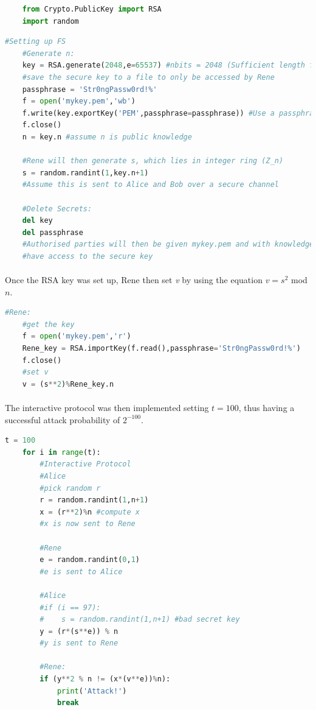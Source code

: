 \documentclass[12pt, twoside]{report}
\begin{document}
	\begin{lstlisting}[language=Python]
	%reset
	from Crypto.PublicKey import RSA
	import random
	\end{lstlisting}
	\begin{lstlisting}[language=Python]
	#Setting up FS
	#Generate n:
	key = RSA.generate(2048,e=65537) #nbits = 2048 (Sufficient length for 2017), e -> FIPS Standard
	#save the secure key to a file to only be accessed by Rene
	passphrase = 'Str0ngPassw0rd!%'
	f = open('mykey.pem','wb')
	f.write(key.exportKey('PEM',passphrase=passphrase)) #Use a passphrase since 
	f.close()
	n = key.n #assume n is public knowledge
	
	#Rene will then generate s, which lies in integer ring (Z_n)
	s = random.randint(1,key.n+1)
	#Assume this is sent to Alice and Bob over a secure channel
	
	#Delete Secrets:
	del key
	del passphrase 
	#Authorised parties will then be given mykey.pem and with knowledge of the passphrase will
	#have access to the secure key
	\end{lstlisting}
	
	\paragraph{ } Once the RSA key was set up, Rene then set \textit{v} by using the equation $v=s^2$ mod $n$.
	
	\begin{lstlisting}[language=Python]
	#Rene:
	#get the key
	f = open('mykey.pem','r')
	Rene_key = RSA.importKey(f.read(),passphrase='Str0ngPassw0rd!%')
	f.close()
	#set v
	v = (s**2)%Rene_key.n
	\end{lstlisting}
	
	\paragraph{ }The interactive protocol was then implemented setting $t=100$, thus having a successful attack probability of $2^{-100}$.
	
	\begin{lstlisting}[language=Python]
	t = 100
	for i in range(t):
		#Interactive Protocol
		#Alice
		#pick random r
		r = random.randint(1,n+1)
		x = (r**2)%n #compute x
		#x is now sent to Rene
		
		#Rene
		e = random.randint(0,1)
		#e is sent to Alice
		
		#Alice
		#if (i == 97):
		#    s = random.randint(1,n+1) #bad secret key
		y = (r*(s**e)) % n
		#y is sent to Rene
		
		#Rene:
		if (y**2 % n != (x*(v**e))%n):
			print('Attack!')
			break
	\end{lstlisting}
	
\end{document}
